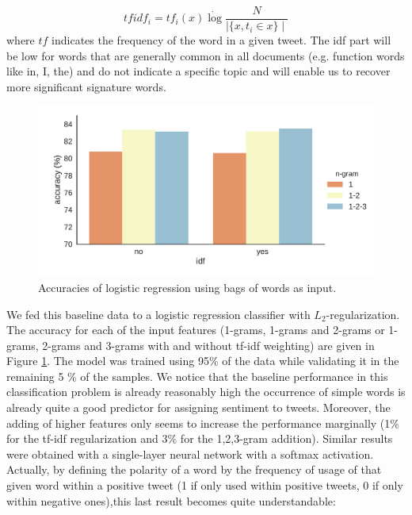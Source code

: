 \documentclass[10pt,conference,compsocconf,retainorgcmds]{IEEEtran}
\begin{document}
$$ tfidf_i =tf_i(x)\dot \log{\frac{N}{\mid \{x, t_i \in x \} \mid}} $$
where $tf$ indicates the frequency of the word in a given tweet. The idf part will be low for words that are generally common in all documents (e.g. function words like in, I, the) and do not indicate a specific topic and will enable us to recover more significant signature words. \\
\begin{figure}[h]
    \centering
    \includegraphics[width=0.9\linewidth]{imag/idf.pdf}
    \caption{Accuracies of logistic regression using bags of words as input.}
    \label{fig:my_label}
\end{figure}

We fed this baseline data to a logistic regression classifier with  $L_2$-regularization. The accuracy for each of the input features (1-grams, 1-grams and 2-grams or 1-grams, 2-grams and 3-grams with and without tf-idf weighting) are given in Figure \ref{fig:my_label}. The model was trained using 95\% of the data while validating it in the remaining 5 \% of the samples. We  notice that the baseline performance in this classification problem is already reasonably high the occurrence of simple words is already quite a good predictor for assigning sentiment to tweets. Moreover, the adding of higher features only seems to increase the performance marginally (1\% for the tf-idf regularization and 3\% for the 1,2,3-gram addition). Similar results were obtained with a single-layer neural network with a softmax activation. Actually, by defining the polarity of a word by the frequency of usage of that given word within a positive tweet (1 if only used within positive tweets, 0 if only within negative ones),this last result becomes quite understandable:
\end{document}

